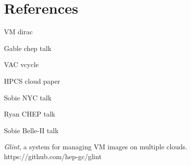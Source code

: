 \documentclass[a4paper]{jpconf}
\begin{document}

\section*{References}
\begin{thebibliography}{9}

VM dirac

Gable chep talk

VAC vcycle

HPCS cloud paper

Sobie NYC talk

Ryan CHEP talk

Sobie Belle-II talk


{\it Glint}, a system for managing VM images on multiple clouds.
https://github.com/hep-gc/glint

\end{thebibliography}
\end{document}
